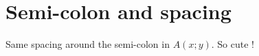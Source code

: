 \documentclass[12pt,a4paper]{article}
\theoremstyle{definition}
\begin{document}
\section{Semi-colon and spacing}

\begin{tcblisting}{}
Same spacing around the semi-colon in $A(x;y)$. So cute !
\end{tcblisting}
\end{document}
